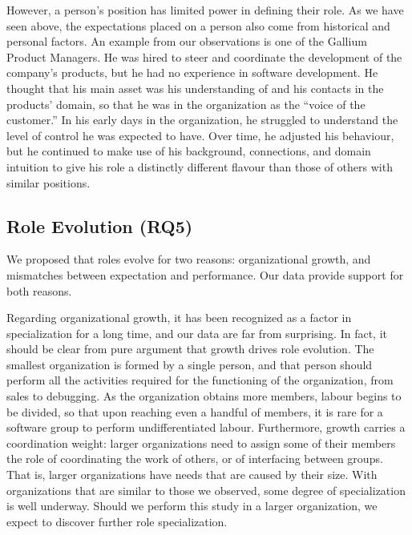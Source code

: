 \documentclass[10pt, conference, compsocconf]{IEEEtran}
\begin{document}
However, a person's position has limited power in defining their role. As we have seen above, the expectations placed on a person also come from historical and personal factors. An example from our observations is one of the Gallium Product Managers. He was hired to steer and coordinate the development of the company's products, but he had no experience in software development. He thought that his main asset was his understanding of and his contacts in the products' domain, so that he was in the organization as the ``voice of the customer.'' In his early days in the organization, he struggled to understand the level of control he was expected to have. Over time, he adjusted his behaviour, but he continued to make use of his background, connections, and domain intuition to give his role a distinctly different flavour than those of others with similar positions.


\subsection{Role Evolution (RQ5)}

We proposed that roles evolve for two reasons: organizational growth, and mismatches between expectation and performance. Our data provide support for both reasons.

Regarding organizational growth, it has been recognized as a factor in specialization for a long time, and our data are far from surprising. In fact, it should be clear from pure argument that growth drives role evolution. The smallest organization is formed by a single person, and that person should perform all the activities required for the functioning of the organization, from sales to debugging. As the organization obtains more members, labour begins to be divided, so that upon reaching even a handful of members, it is rare for a software group to perform undifferentiated labour. Furthermore, growth carries a coordination weight: larger organizations need to assign some of their members the role of coordinating the work of others, or of interfacing between groups. That is, larger organizations have needs that are caused by their size. With organizations that are similar to those we observed, some degree of specialization is well underway. Should we perform this study in a larger organization, we expect to discover further role specialization.
\end{document}
